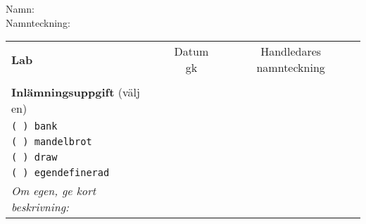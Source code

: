 \vspace{2.5em}\noindent Namn: \dotfill\\

\vspace{1em}\noindent Namnteckning: \dotfill\\

\newcommand{\LabRow}[1]{\\[-1.1em] \texttt{#1} & \dotfill &  \dotfill  \\ \addlinespace }

\begin{table}[h]
\centering
\vspace{1em}
\begin{tabular}{lcc}
\toprule \addlinespace 
{\sffamily\bfseries\small Lab} & {\sffamily\small Datum gk} &	{\sffamily\small Handledares namnteckning}\\ \addlinespace \midrule \\[-0.5em]

\addlinespace \midrule \addlinespace
{\sffamily\small {\bfseries Inlämningsuppgift} (välj en)	} & & \\ \addlinespace\addlinespace %
\texttt{( ) bank}  &  &  \\
\texttt{( ) mandelbrot} \\  
\texttt{( ) draw}  \\
\texttt{( ) egendefinerad}  \\
\textit{\small Om egen, ge kort beskrivning:}\\
\bottomrule
\end{tabular}
\end{table}
